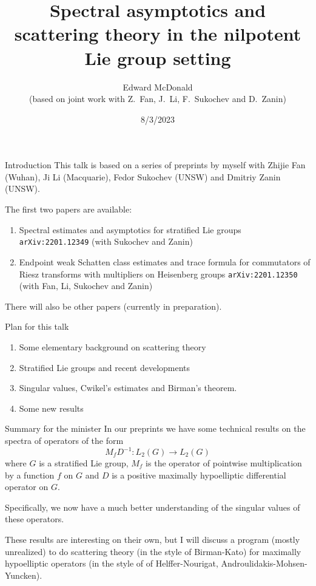 \documentclass{beamer}
\date{8/3/2023}
\newcommand\makebeamertitle{\frame{\maketitle}}%
\numberwithin{equation}{section}
\theoremstyle{plain}
\theoremstyle{plain}
\theoremstyle{definition}
\theoremstyle{plain}
\theoremstyle{plain}
\theoremstyle{definition}
\begin{document}
\title[Spectral asymptotics and nilpotent Lie groups]{Spectral asymptotics and scattering theory in the nilpotent Lie group setting}


\author[E. McDonald]{Edward McDonald\\
(based on joint work with  Z.~Fan, J.~Li, F.~Sukochev and D.~Zanin)}



\makebeamertitle

\begin{frame}{Introduction}
    This talk is based on a series of preprints by myself with Zhijie Fan (Wuhan), Ji Li (Macquarie), Fedor Sukochev (UNSW) and Dmitriy Zanin (UNSW). 
    
    The first two papers are available:
    \begin{enumerate}[{\rm (a)}]
      \item{} Spectral estimates and asymptotics for stratified Lie groups \texttt{arXiv:2201.12349} (with Sukochev and Zanin)
      \item{} Endpoint weak Schatten class estimates and trace formula for commutators of Riesz transforms with multipliers on Heisenberg groups \texttt{arXiv:2201.12350} (with Fan, Li, Sukochev and Zanin) 
    \end{enumerate}
    There will also be other papers (currently in preparation).
\end{frame}

\begin{frame}{Plan for this talk}
    \begin{enumerate}
        \item{} Some elementary background on scattering theory
        \item{} Stratified Lie groups and recent developments
        \item{} Singular values, Cwikel's estimates and Birman's theorem.
        \item{} Some new results
    \end{enumerate}
\end{frame}

\begin{frame}{Summary for the minister}
  In our preprints we have some technical results on the spectra of operators of the form
  \[
    M_f D^{-1}:L_2(G)\to L_2(G)
  \]
  where $G$ is a stratified Lie group, $M_f$ is the operator of pointwise multiplication by a function $f$ on $G$ and $D$ is a positive maximally hypoelliptic differential operator on $G.$

  Specifically, we now have a much better understanding of the singular values of these operators.
  \pause

  These results are interesting on their own, but I will discuss a program (mostly unrealized) to do scattering theory (in the style of Birman-Kato) for maximally hypoelliptic operators (in the style of of Helffer-Nourigat, Androulidakis-Mohsen-Yuncken).
\end{frame}
\end{document}
